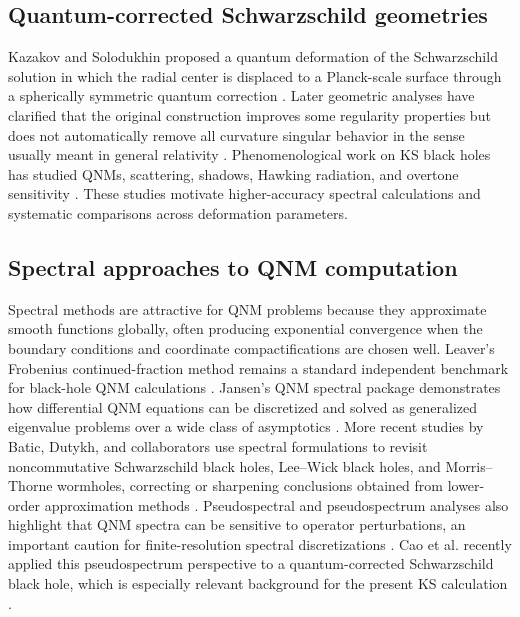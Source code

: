 \documentclass[10pt,letterpaper,twocolumn]{article}
\begin{document}
\subsection{Quantum-corrected Schwarzschild geometries}

Kazakov and Solodukhin proposed a quantum deformation of the Schwarzschild solution in which the radial center is displaced to a Planck-scale surface through a spherically symmetric quantum correction \cite{Kazakov1994}. Later geometric analyses have clarified that the original construction improves some regularity properties but does not automatically remove all curvature singular behavior in the sense usually meant in general relativity \cite{Berry2021}. Phenomenological work on KS black holes has studied QNMs, scattering, shadows, Hawking radiation, and overtone sensitivity \cite{Konoplya2020,Bolokhov2025}. These studies motivate higher-accuracy spectral calculations and systematic comparisons across deformation parameters.

\subsection{Spectral approaches to QNM computation}

Spectral methods are attractive for QNM problems because they approximate smooth functions globally, often producing exponential convergence when the boundary conditions and coordinate compactifications are chosen well. Leaver's Frobenius continued-fraction method remains a standard independent benchmark for black-hole QNM calculations \cite{Leaver1985}. Jansen's QNM spectral package demonstrates how differential QNM equations can be discretized and solved as generalized eigenvalue problems over a wide class of asymptotics \cite{Jansen2017}. More recent studies by Batic, Dutykh, and collaborators use spectral formulations to revisit noncommutative Schwarzschild black holes, Lee--Wick black holes, and Morris--Thorne wormholes, correcting or sharpening conclusions obtained from lower-order approximation methods \cite{Batic2024Noncomm,Batic2024LeeWick,Batic2024Wormhole}. Pseudospectral and pseudospectrum analyses also highlight that QNM spectra can be sensitive to operator perturbations, an important caution for finite-resolution spectral discretizations \cite{Jaramillo2021}. Cao et al. recently applied this pseudospectrum perspective to a quantum-corrected Schwarzschild black hole, which is especially relevant background for the present KS calculation \cite{Cao2024}.
\end{document}
